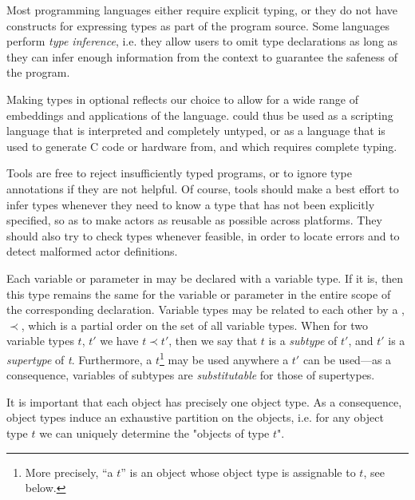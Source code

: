 \begin{rationale}
  Most programming languages either require explicit typing, or they
  do not have constructs for expressing types as part of the program
  source. Some languages perform {\em type inference}, i.e. they allow
  users to omit type declarations as long as they can infer enough
  information from the context to guarantee the safeness of the
  program.
  
  Making types in \Cal optional reflects our choice to allow for a
  wide range of embeddings and applications of the language. \Cal
  could thus be used as a scripting language that is interpreted and
  completely untyped, or as a language that is used to generate C code
  or hardware from, and which requires complete typing.
  
  Tools are free to reject insufficiently typed programs, or to ignore
  type annotations if they are not helpful. Of course, tools should
  make a best effort to infer types whenever they need to know a type
  that has not been explicitly specified, so as to make actors as
  reusable as possible across platforms. They should also try to check
  types whenever feasible, in order to locate errors and to detect
  malformed actor definitions.
\end{rationale}


 
 Each variable or
parameter in \Cal may be declared with a variable type. If it is, then
this type remains the same for the variable or parameter in the entire
scope of the corresponding declaration.  Variable types may be related
to each other by a ,
$\prec$, which is a partial order on the set of all variable types.
When for two variable types $t$, $t'$ we have $t\prec t'$, then we say
that $t$ is a {\em subtype} of $t'$, and $t'$ is a {\em supertype} of
{\em t}.  Furthermore, a $t$\footnote{More precisely, ``a $t$'' is an object whose object
type is assignable to $t$, see below.} may be used anywhere a $t'$ can be
used---as a consequence, variables of
subtypes are {\em substitutable} for those of supertypes.

It is important that each object has
precisely one object type. As a consequence, object types induce an
exhaustive partition on the objects, i.e. for any object type $t$ we
can uniquely determine the "objects of type $t$".


